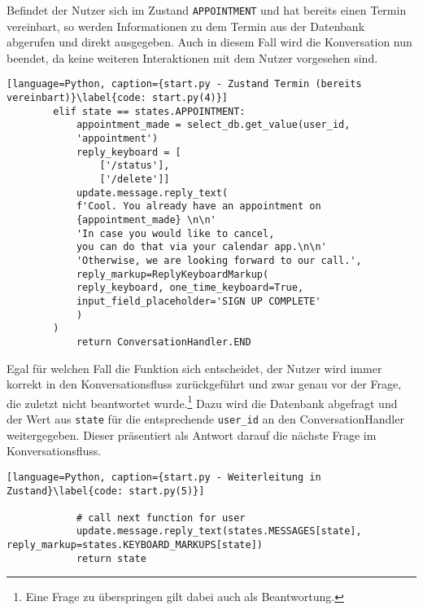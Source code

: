             Befindet der Nutzer sich im Zustand \verb|APPOINTMENT| und hat bereits einen Termin vereinbart, so werden Informationen zu dem Termin aus der Datenbank abgerufen und direkt ausgegeben. Auch in diesem Fall wird die Konversation nun beendet, da keine weiteren Interaktionen mit dem Nutzer vorgesehen sind.
            \begin{lstlisting}[language=Python, caption={start.py - Zustand Termin (bereits vereinbart)}\label{code: start.py(4)}]
        elif state == states.APPOINTMENT:
            appointment_made = select_db.get_value(user_id, 
            'appointment')
            reply_keyboard = [
                ['/status'], 
                ['/delete']]
            update.message.reply_text(
            f'Cool. You already have an appointment on 
            {appointment_made} \n\n'
            'In case you would like to cancel, 
            you can do that via your calendar app.\n\n'
            'Otherwise, we are looking forward to our call.',
            reply_markup=ReplyKeyboardMarkup(
            reply_keyboard, one_time_keyboard=True, 
            input_field_placeholder='SIGN UP COMPLETE'
            )
        )
            return ConversationHandler.END
            \end{lstlisting}
            Egal für welchen Fall die Funktion sich entscheidet, der Nutzer wird immer korrekt in den Konversationsfluss zurückgeführt und zwar genau vor der Frage, die zuletzt nicht beantwortet wurde.\footnote{Eine Frage zu überspringen gilt dabei auch als Beantwortung.} Dazu wird die Datenbank abgefragt und der Wert aus \verb|state| für die entsprechende \verb|user_id| an den ConversationHandler weitergegeben. Dieser präsentiert als Antwort darauf die nächste Frage im Konversationsfluss. \\
            \begin{lstlisting}[language=Python, caption={start.py - Weiterleitung in Zustand}\label{code: start.py(5)}]

            # call next function for user
            update.message.reply_text(states.MESSAGES[state], reply_markup=states.KEYBOARD_MARKUPS[state])
            return state
            \end{lstlisting}

